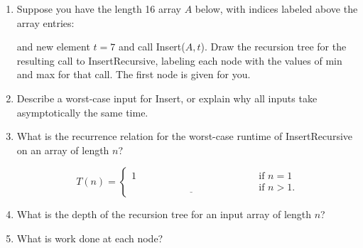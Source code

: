 \documentclass[11pt]{article}
\begin{document}
\begin{enumerate}
\item Suppose you have the length 16 array $A$ below, with indices
labeled above the array entries:

\begin{center}
\end{center}

and new element $t=7$ and call Insert($A, t$). Draw the recursion tree for the resulting call to
InsertRecursive, labeling each node with the values of min and max for that call. The first node is
given for you.

\begin{center}
\end{center}

\newpage


\item Describe a worst-case input for Insert, or explain why
all inputs take asymptotically the same time.
\vspace{1.5in}

\item 
What is the recurrence relation for the worst-case runtime of InsertRecursive on
an array of length $n$?

    \[
T(n) = 
\begin{cases} 
      1 & \text{if } n = 1\\
      \underline{\hspace{2in}} & \text{if } n > 1.
   \end{cases}
\]

\item What is the depth of the recursion tree for an input array of length $n$?
\vspace{1in}

\item What is work done at each node?
\vspace{1in}


\end{enumerate}
\end{document}
